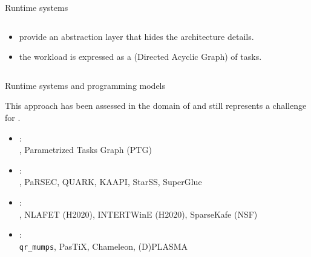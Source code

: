 \begin{frame}{Runtime systems}
\begin{columns}
\begin{column}{0.55\textwidth}
\begin{itemize}
      \item<2->  provide an abstraction layer that hides
        the architecture details.
      \item<3-> the workload is expressed as a  (Directed
        Acyclic Graph) of tasks.
      \end{itemize}
    \end{column}
  \end{columns}
\end{frame}

\begin{frame}{Runtime systems and programming models}

  This approach has been assessed in the domain of  and still represents a challenge for .

  \begin{itemize}
  \item {}: \\ ,
    Parametrized Tasks Graph (PTG) %
  \item {}: \\ , PaRSEC, QUARK, KAAPI, StarSS,
    SuperGlue
  \item {}: \\ , NLAFET
    (H2020), INTERTWinE (H2020), SparseKafe (NSF)
  \item {}: \\ \texttt{qr\_mumps}, PasTiX,
    Chameleon, (D)PLASMA
  \end{itemize}

  \vspace{0.3cm}


\end{frame}

